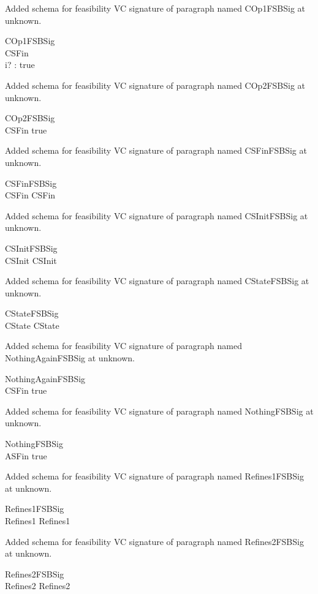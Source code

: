 \documentclass{article}
\begin{document}
Added schema for feasibility VC signature of paragraph named COp1FSBSig at unknown.
\begin{schema}{COp1FSBSig}
\\
 CSFin \\
 i? : \nat 
\where
 true
\end{schema}


Added schema for feasibility VC signature of paragraph named COp2FSBSig at unknown.
\begin{schema}{COp2FSBSig}
\\
 CSFin 
\where
 true
\end{schema}


Added schema for feasibility VC signature of paragraph named CSFinFSBSig at unknown.
\begin{schema}{CSFinFSBSig}
\\
 CSFin 
\where
 CSFin
\end{schema}


Added schema for feasibility VC signature of paragraph named CSInitFSBSig at unknown.
\begin{schema}{CSInitFSBSig}
\\
 CSInit 
\where
 CSInit
\end{schema}


Added schema for feasibility VC signature of paragraph named CStateFSBSig at unknown.
\begin{schema}{CStateFSBSig}
\\
 CState 
\where
 CState
\end{schema}


Added schema for feasibility VC signature of paragraph named NothingAgainFSBSig at unknown.
\begin{schema}{NothingAgainFSBSig}
\\
 CSFin 
\where
 true
\end{schema}


Added schema for feasibility VC signature of paragraph named NothingFSBSig at unknown.
\begin{schema}{NothingFSBSig}
\\
 ASFin 
\where
 true
\end{schema}


Added schema for feasibility VC signature of paragraph named Refines1FSBSig at unknown.
\begin{schema}{Refines1FSBSig}
\\
 Refines1 
\where
 Refines1
\end{schema}


Added schema for feasibility VC signature of paragraph named Refines2FSBSig at unknown.
\begin{schema}{Refines2FSBSig}
\\
 Refines2 
\where
 Refines2
\end{schema}
\end{document}
